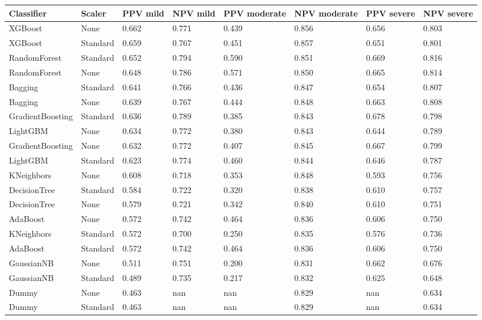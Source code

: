 \begin{tabular}{llllllll}
\toprule
Classifier & Scaler & PPV mild & NPV mild & PPV moderate & NPV moderate & PPV severe & NPV severe \\
\midrule
XGBoost & None & 0.662 & 0.771 & 0.439 & 0.856 & 0.656 & 0.803 \\
XGBoost & Standard & 0.659 & 0.767 & 0.451 & 0.857 & 0.651 & 0.801 \\
RandomForest & Standard & 0.652 & 0.794 & 0.590 & 0.851 & 0.669 & 0.816 \\
RandomForest & None & 0.648 & 0.786 & 0.571 & 0.850 & 0.665 & 0.814 \\
Bagging & Standard & 0.641 & 0.766 & 0.436 & 0.847 & 0.654 & 0.807 \\
Bagging & None & 0.639 & 0.767 & 0.444 & 0.848 & 0.663 & 0.808 \\
GradientBoosting & Standard & 0.636 & 0.789 & 0.385 & 0.843 & 0.678 & 0.798 \\
LightGBM & None & 0.634 & 0.772 & 0.380 & 0.843 & 0.644 & 0.789 \\
GradientBoosting & None & 0.632 & 0.772 & 0.407 & 0.845 & 0.667 & 0.799 \\
LightGBM & Standard & 0.623 & 0.774 & 0.460 & 0.844 & 0.646 & 0.787 \\
KNeighbors & None & 0.608 & 0.718 & 0.353 & 0.848 & 0.593 & 0.756 \\
DecisionTree & Standard & 0.584 & 0.722 & 0.320 & 0.838 & 0.610 & 0.757 \\
DecisionTree & None & 0.579 & 0.721 & 0.342 & 0.840 & 0.610 & 0.751 \\
AdaBoost & None & 0.572 & 0.742 & 0.464 & 0.836 & 0.606 & 0.750 \\
KNeighbors & Standard & 0.572 & 0.700 & 0.250 & 0.835 & 0.576 & 0.736 \\
AdaBoost & Standard & 0.572 & 0.742 & 0.464 & 0.836 & 0.606 & 0.750 \\
GaussianNB & None & 0.511 & 0.751 & 0.200 & 0.831 & 0.662 & 0.676 \\
GaussianNB & Standard & 0.489 & 0.735 & 0.217 & 0.832 & 0.625 & 0.648 \\
Dummy & None & 0.463 & nan & nan & 0.829 & nan & 0.634 \\
Dummy & Standard & 0.463 & nan & nan & 0.829 & nan & 0.634 \\
\bottomrule
\end{tabular}
